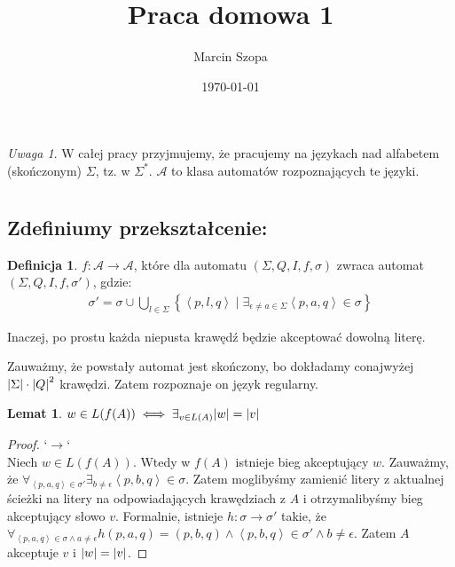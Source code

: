 \documentclass{article}
\title{Praca domowa 1}
\author{Marcin Szopa}
\date{\today}
\newtheorem{lemma}[theorem]{Lemat}
\theoremstyle{definition}
\newtheorem{definition}{Definicja}[section]
\theoremstyle{remark}
\newtheorem*{remark}{Uwaga}
\begin{document}
\maketitle

\begin{remark}
W całej pracy przyjmujemy, że pracujemy na językach nad alfabetem (skończonym) \(\Sigma\), tz. w \( \Sigma^* \). \(\mathcal{A}\) to klasa automatów rozpoznających te języki.
\end{remark}

\section{}

\subsection{Zdefiniumy przekształcenie:}

\begin{definition}
\(f: \mathcal{A} \to \mathcal{A}\), które dla automatu \(\left(\Sigma, Q, I, f, \sigma\right)\) zwraca automat \(\left(\Sigma, Q, I, f, \sigma'\right)\), gdzie:
\begin{align*}
\sigma' = \sigma \cup \bigcup_{l \in \Sigma} \left\{ \left< p, l, q \right> \mid \exists_{\epsilon \neq a \in \Sigma}{\left< p, a, q \right> \in \sigma} \right\}
\end{align*}
\end{definition}
Inaczej, po prostu każda niepusta krawędź będzie akceptować dowolną literę.

Zauważmy, że powstały automat jest skończony, bo dokładamy conajwyżej \(\abs{\Sigma} \cdot \abs{Q}^2\) krawędzi. Zatem rozpoznaje on język regularny.

\begin{lemma}
    \(w \in L(f(A)) \iff \exists_{v \in L(A)} \abs{w}=\abs{v}\)
\end{lemma}
\begin{proof}
`\(\rightarrow\)` \\
Niech \(w \in L(f(A))\). Wtedy w \(f(A)\) istnieje bieg akceptujący \(w\).
Zauważmy, że \(\forall_{\left< p, a, q \right> \in \sigma'} \exists_{b \neq \epsilon} \left< p, b, q \right> \in \sigma\).
Zatem moglibyśmy zamienić litery z aktualnej ścieżki na litery na odpowiadających krawędziach z \(A\)
i otrzymalibyśmy bieg akceptujący słowo \(v\).
Formalnie, istnieje \(h: \sigma \to \sigma'\) takie,
że \( \forall_{\left< p, a, q \right> \in \sigma \land a \neq \epsilon} {h(p, a, q) = (p, b, q) \land \left< p, b, q \right> \in \sigma' \land b \neq \epsilon }\).
Zatem \(A\) akceptuje \(v\) i \(\abs{w} = \abs{v}\).
\end{proof}
\end{document}
